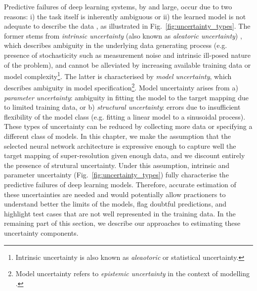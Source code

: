 Predictive failures of deep learning systems, by and large, occur due to two reasons: i) the task itself is inherently ambiguous or ii) the learned model is not adequate to describe the data  \cite{hora1996aleatory,der2009aleatory,tanno2017bayesian,kendall2017uncertainties}, as illustrated in Fig.~\ref{fig:uncertainty_types}. The former stems from \emph{intrinsic uncertainty} (also known as \textit{aleatoric uncertainty}) \cite{wang1996intrinsic}, which describes ambiguity in the underlying data generating process  (e.g. presence of stochasticity such as measurement noise and intrinsic ill-posed nature of the problem), and cannot be alleviated by increasing available training data or model complexity\footnote{Intrinsic uncertainty is also known as \textit{aleaotoric} or statistical uncertainty.}. The latter is characterised by \textit{model uncertainty}\cite{draper1995assessment}, which describes ambiguity in model specification\footnote{Model uncertainty refers to \textit{epistemic uncertainty} in the context of modelling \cite{hora1996aleatory}. }. Model uncertainty arises from a) \textit{parameter uncertainty}: ambiguity in fitting the model to the target mapping due to limited training data, or b) \textit{structural uncertainty}: errors due to insufficient flexibility of the model class (e.g. fitting a linear model to a sinusoidal process). These types of uncertainty can be reduced by collecting more data or specifying a different class of models. In this chapter, we make the assumption that the selected neural network architecture is expressive enough to capture well the target mapping of super-resolution given enough data, and we discount entirely the presence of strutural uncertainty. Under this assumption, intrinsic and parameter uncertainty (Fig.~\ref{fig:uncertainty_types}) fully characterise the predictive failures of deep learning models.  Therefore, accurate estimation of these uncertainties are needed and would potentially allow practioners to understand better the limits of the models, flag doubtful predictions, and highlight test cases that are not well represented in the training data. In the remaining part of this section, we describe our approaches to estimating these uncertainty components.



